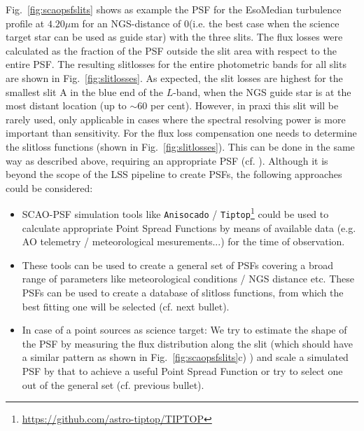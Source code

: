 Fig.~\ref{fig:scaopsfslits} shows as example the \ac{PSF} for the EsoMedian turbulence profile at $4.20\mu$m for an \ac{NGS}-distance of 0\arcsec  (i.e. the best case when the science target star can be used as guide star) with the three slits. The flux losses were calculated as the fraction of the \ac{PSF} outside the slit area with respect to the entire \ac{PSF}. The resulting slitlosses for the entire photometric bands for all slits are shown in Fig.~\ref{fig:slitlosses}. As expected, the slit losses are highest for the smallest slit A in the blue end of the $L$-band, when the \ac{NGS} guide star is at the most distant location (up to $\sim60$ per cent). However, in praxi this slit will be rarely used, only applicable in cases where the spectral resolving power is more important than sensitivity. %
For the flux loss compensation one needs to determine the slitloss functions (shown in Fig.~\ref{fig:slitlosses}). This can be done in the same way as described above, requiring an appropriate \ac{PSF} (cf. ). Although it is beyond the scope of the \ac{LSS} pipeline to create \ac{PSF}s, the following approaches could be considered:
\begin{itemize}
    \item \ac{SCAO}-\ac{PSF} simulation tools like \texttt{Anisocado} / \texttt{Tiptop}\footnote{\url{https://github.com/astro-tiptop/TIPTOP}} could be used to calculate appropriate Point Spread Functions by means of available data (e.g. \ac{AO} telemetry / meteorological mesurements...) for the time of observation.
    \item These tools can be used to create a general set of \ac{PSF}s covering a broad range of parameters like meteorological conditions / \ac{NGS} distance etc. These \ac{PSF}s can be used to create a database of slitloss functions, from which the best fitting one will be selected (cf. next bullet).
    \item In case of a point sources as science target: We try to estimate the shape of the \ac{PSF} by measuring the flux distribution along the slit (which should have a similar pattern as shown in Fig.~\ref{fig:scaopsfslits}c) ) and scale a simulated \ac{PSF} by that to achieve a useful Point Spread Function or try to select one out of the general set (cf. previous bullet).
\end{itemize}
